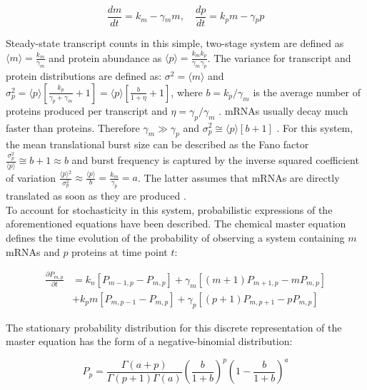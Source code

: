 \begin{equation}
\frac{dm}{dt}=k_m-\gamma{}_mm,\quad \frac{dp}{dt}=k_pm-\gamma{}_pp
\end{equation}

\doublespacing
\noindent Steady-state transcript counts in this simple, two-stage system are defined as $\langle{}m\rangle{}=\frac{k_m}{\gamma_m}$  and protein abundance as $\langle{}p\rangle{}=\frac{k_mk_p}{\gamma_m\gamma_p }$. The variance for transcript and protein distributions are defined as: $\sigma^2=\langle{}m\rangle{}$ and $\sigma_p^2=\langle{}p\rangle{}\left[\frac{k_p}{\gamma_p+\gamma_m}+1\right]=\langle{}p\rangle{}\left[\frac{b}{1+\eta}+1\right]$, where $b=k_p/\gamma_m$  is the average number of proteins produced per transcript and $\eta=\gamma_p/\gamma_m$  \citep{Tsimring2014, Thattai2001}. mRNAs usually decay much faster than proteins. Therefore $\gamma_m\gg{}\gamma_p$ and $\sigma_p^2\cong\langle{}p\rangle{}\left[b+1\right]$ \citep{Thattai2001}. For this system, the mean translational burst size can be described as the Fano factor $\frac{\sigma_p^2}{\langle{}p\rangle}\cong{}b+1\approx{}b$ and burst frequency is captured by the inverse squared coefficient of variation $\frac{\langle{}p\rangle{}^2}{\sigma_p^2}\approx{}\frac{\langle{}p\rangle{}}{b}=\frac{k_m}{\gamma_p}=a$. The latter assumes that mRNAs are directly translated as soon as they are produced \citep{Friedman2006}.\\

\onehalfspacing
\noindent To account for stochasticity in this system, probabilistic expressions of the aforementioned equations have been described. The chemical master equation defines the time evolution of the probability of observing a system containing $m$ mRNAs and $p$ proteins at time point $t$:

\begin{align}
\frac{\partial{}P_{m,p}}{\partial{}t}&=k_n\left[P_{m-1,p}-P_{m,p}\right]+\gamma_m\left[(m+1)P_{m+1,p}-mP_{m,p}\right] \nonumber \\
&+k_pm\left[P_{m,p-1}-P_{m,p}\right]+\gamma_p\left[(p+1)P_{m,p+1}-pP_{m,p}\right]
\end{align}

\noindent The stationary probability distribution for this discrete representation of the master equation has the form of a negative-binomial distribution:

\begin{equation}
P_p=\frac{\Gamma(a+p)}{\Gamma(p+1)\Gamma(a)}\left(\frac{b}{1+b}\right)^p\left(1-\frac{b}{1+b}\right)^a
\end{equation}

